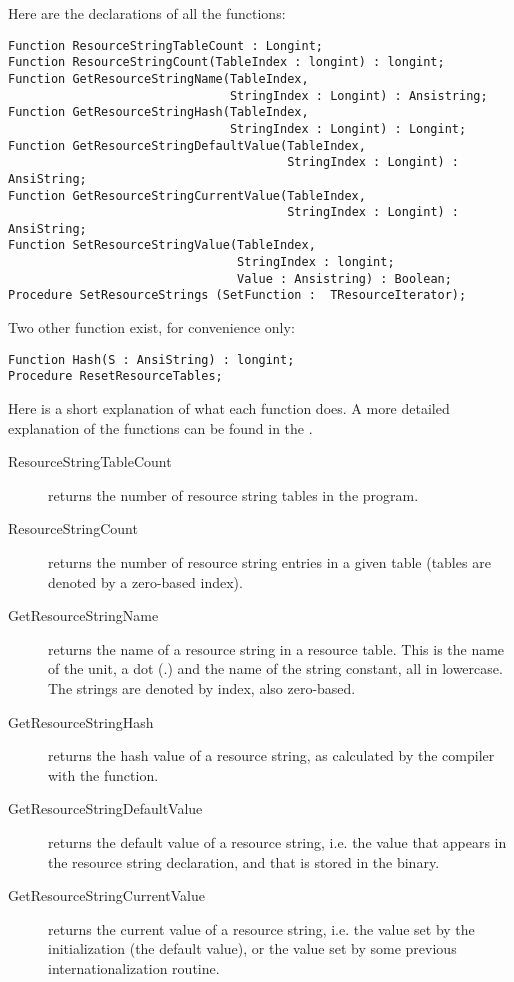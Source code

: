 {Here are the declarations of all the functions:
\begin{verbatim}
Function ResourceStringTableCount : Longint;
Function ResourceStringCount(TableIndex : longint) : longint;
Function GetResourceStringName(TableIndex,
                               StringIndex : Longint) : Ansistring;
Function GetResourceStringHash(TableIndex,
                               StringIndex : Longint) : Longint;
Function GetResourceStringDefaultValue(TableIndex,
                                       StringIndex : Longint) : AnsiString;
Function GetResourceStringCurrentValue(TableIndex,
                                       StringIndex : Longint) : AnsiString;
Function SetResourceStringValue(TableIndex,
                                StringIndex : longint;
                                Value : Ansistring) : Boolean;
Procedure SetResourceStrings (SetFunction :  TResourceIterator);
\end{verbatim}
Two other function exist, for convenience only:
\begin{verbatim}
Function Hash(S : AnsiString) : longint;
Procedure ResetResourceTables;
\end{verbatim}
Here is a short explanation of what each function does. A more detailed
explanation of the functions can be found in the .
\begin{description}
\item[ResourceStringTableCount] returns the number of resource string tables
in the program.
\item[ResourceStringCount] returns the number of resource string entries in
a given table (tables are denoted by a zero-based index).
\item[GetResourceStringName] returns the name of a resource string in a
resource table. This is the name of the unit, a dot (.) and the name of
the string constant, all in lowercase. The strings are denoted by index,
also zero-based.
\item[GetResourceStringHash] returns the hash value of a resource string, as
calculated by the compiler with the  function.
\item[GetResourceStringDefaultValue] returns the default value of a resource
string, i.e. the value that appears in the resource string declaration, and
that is stored in the binary.
\item[GetResourceStringCurrentValue] returns the current value of a resource
string, i.e. the value set by the initialization (the default value), or the
value set by some previous internationalization routine.

\end{description}}
